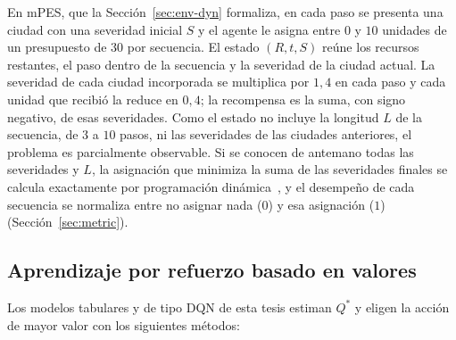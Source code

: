 \documentclass[../00_Main/Main.tex]{subfiles}
\begin{document}
En mPES, que la Secci\'on~\ref{sec:env-dyn} formaliza, en cada paso se
presenta una ciudad con una severidad inicial $S$ y el agente le asigna
entre $0$ y $10$ unidades de un presupuesto de $30$ por secuencia. El
estado $(R, t, S)$ re\'une los recursos restantes, el paso dentro de la
secuencia y la severidad de la ciudad actual. La severidad de cada ciudad
incorporada se multiplica por $1{,}4$ en cada paso y cada unidad que
recibi\'o la reduce en $0{,}4$; la recompensa es la suma, con signo
negativo, de esas severidades. Como el estado no incluye la longitud $L$
de la secuencia, de $3$ a $10$ pasos, ni las severidades de las ciudades
anteriores, el problema es parcialmente observable. Si se conocen de
antemano todas las severidades y $L$, la asignaci\'on que minimiza la
suma de las severidades finales se calcula exactamente por
programaci\'on din\'amica~\citep{SuttonBarto2018}, y el desempe\~no de
cada secuencia se normaliza entre no asignar nada ($0$) y esa
asignaci\'on ($1$) (Secci\'on~\ref{sec:metric}).

\subsection{Aprendizaje por refuerzo basado en valores}\label{sec:value-bg}

Los modelos tabulares y de tipo DQN de esta tesis estiman $Q^{*}$ y
eligen la acci\'on de mayor valor con los siguientes m\'etodos:
\end{document}
